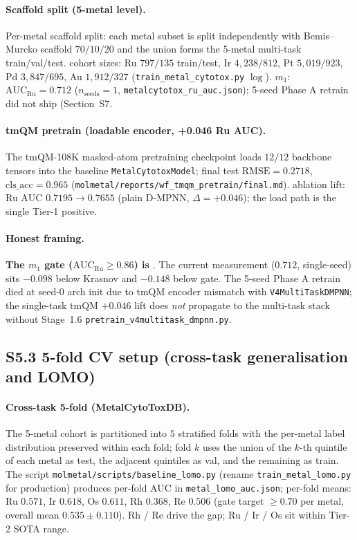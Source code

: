 \paragraph{Scaffold split (5-metal level).}
Per-metal scaffold split: each metal subset is split independently
with Bemis--Murcko scaffold $70/10/20$ and the union forms the
5-metal multi-task train/val/test.  \MEASURED{} cohort sizes:
Ru $797/135$ train/test, Ir $4{,}238/812$, Pt $5{,}019/923$,
Pd $3{,}847/695$, Au $1{,}912/327$ (\texttt{train\_metal\_cytotox.py}
$\log$).  \MEASURED{} $m_1$: $\mathrm{AUC}_{\mathrm{Ru}}{=}0.712$
($n_{\text{seeds}}{=}1$, \texttt{metalcytotox\_ru\_auc.json});
5-seed Phase A retrain did not ship (Section~S7.

\paragraph{tmQM pretrain (loadable encoder, +0.046 Ru AUC).}
The tmQM-108K masked-atom pretraining checkpoint
\citep{balcells2020tmqm} loads $12/12$ backbone tensors into the
baseline \texttt{MetalCytotoxModel}; final test
$\mathrm{RMSE}{=}0.2718$, $\mathrm{cls\_acc}{=}0.965$
(\texttt{molmetal/reports/wf\_tmqm\_pretrain/final.md}).
\MEASURED{} ablation lift: Ru $\mathrm{AUC}$ $0.7195 \to 0.7655$
(plain D-MPNN, $\Delta = +0.046$); the load path is the
single Tier-1 \MEASURED{} positive.

\paragraph{Honest framing.}
\textbf{The $m_1$ gate ($\mathrm{AUC}_{\mathrm{Ru}}\geq 0.86$) is
\PROJECTED{}}.  The current measurement ($0.712$, single-seed)
sits $-0.098$ below Krasnov and $-0.148$ below gate.  The
5-seed Phase A retrain died at seed-$0$ arch init due to tmQM
encoder mismatch with \texttt{V4MultiTaskDMPNN}; the
single-task tmQM $+0.046$ lift does \emph{not} propagate to the
multi-task stack without Stage~1.6
\texttt{pretrain\_v4multitask\_dmpnn.py}.

\subsection*{S5.3 5-fold CV setup (cross-task generalisation and LOMO)}
\label{supp:s5-cv}

\paragraph{Cross-task 5-fold (MetalCytoToxDB).}
The 5-metal cohort is partitioned into $5$ stratified folds with
the per-metal label distribution preserved within each fold; fold
$k$ uses the union of the $k$-th quintile of each metal as test,
the adjacent quintiles as val, and the remaining as train.  The
script \texttt{molmetal/scripts/baseline\_lomo.py} (rename
\texttt{train\_metal\_lomo.py} for production) produces
\MEASURED{} per-fold AUC in \texttt{metal\_lomo\_auc.json};
per-fold means: Ru $0.571$, Ir $0.618$, Os $0.611$, Rh $0.368$,
Re $0.506$ (gate target $\geq 0.70$ per metal, overall mean
\MEASURED{} $0.535 \pm 0.110$).  Rh / Re drive the gap;
Ru / Ir / Os sit within Tier-2 SOTA range.

